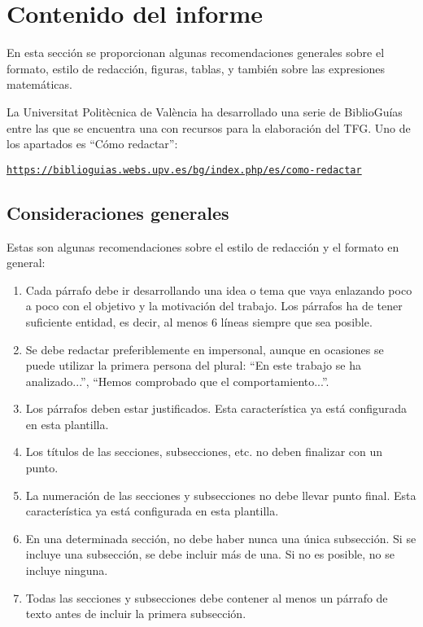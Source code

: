 \documentclass[11pt]{article}
\begin{document}

\section{Contenido del informe}
\label{sec:contenido}

En esta sección se proporcionan algunas recomendaciones generales sobre el formato, estilo de redacción, figuras, tablas, y también sobre las expresiones matemáticas.

La Universitat Politècnica de València ha desarrollado una serie de BiblioGuías entre las que se encuentra una con recursos para la elaboración del TFG. Uno de los apartados es “Cómo redactar”:

\texttt{\url{https://biblioguias.webs.upv.es/bg/index.php/es/como-redactar}}


\subsection{Consideraciones generales}

Estas son algunas recomendaciones sobre el estilo de redacción y el formato en general:

\begin{enumerate}

    \item Cada párrafo debe ir desarrollando una idea o tema que vaya enlazando poco a poco con el objetivo y la motivación del trabajo. Los párrafos ha de tener suficiente entidad, es decir, al menos 6 líneas siempre que sea posible.
    
    \item Se debe redactar preferiblemente en impersonal, aunque en ocasiones se puede utilizar la primera persona del plural: ``En este trabajo se ha analizado...'', ``Hemos comprobado que el comportamiento...''.

    \item Los párrafos deben estar justificados. Esta característica ya está configurada en esta plantilla.

    \item Los títulos de las secciones, subsecciones, etc. no deben finalizar con un punto. 

    \item La numeración de las secciones y subsecciones no debe llevar punto final. Esta característica ya está configurada en esta plantilla.

    \item En una determinada sección, no debe haber nunca una única subsección. Si se incluye una subsección, se debe incluir más de una. Si no es posible, no se incluye ninguna.

    \item Todas las secciones y subsecciones debe contener al menos un párrafo de texto antes de incluir la primera subsección.

\end{enumerate}
\end{document}
